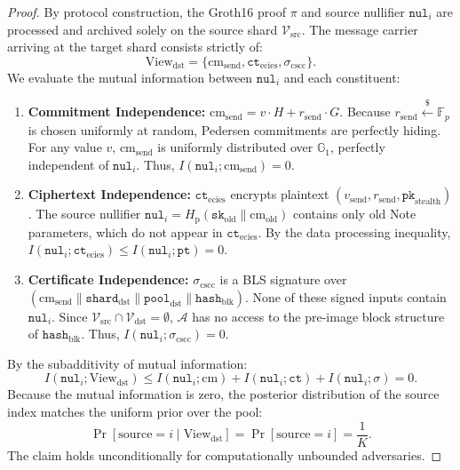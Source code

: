 \documentclass[journal,10pt,twocolumn]{IEEEtran}
\theoremstyle{definition}
\theoremstyle{remark}
\begin{document}
\begin{proof}
By protocol construction, the Groth16 proof $\pi$ and source nullifier $\mathtt{nul}_i$ are processed and archived solely on the source shard $\mathcal{V}_{\text{src}}$. The message carrier arriving at the target shard consists strictly of:
\begin{equation}
\text{View}_{\text{dst}} = \{ \text{cm}_{\text{send}}, \mathtt{ct}_{\text{ecies}}, \sigma_{\text{cscc}} \}.
\end{equation}
We evaluate the mutual information between $\mathtt{nul}_i$ and each constituent:
\begin{enumerate}
    \item \textbf{Commitment Independence:} $\text{cm}_{\text{send}} = v \cdot H + r_{\text{send}} \cdot G$. Because $r_{\text{send}} \xleftarrow{\$} \mathbb{F}_p$ is chosen uniformly at random, Pedersen commitments are perfectly hiding. For any value $v$, $\text{cm}_{\text{send}}$ is uniformly distributed over $\mathbb{G}_1$, perfectly independent of $\mathtt{nul}_i$. Thus, $I(\mathtt{nul}_i; \text{cm}_{\text{send}}) = 0$.
    \item \textbf{Ciphertext Independence:} $\mathtt{ct}_{\text{ecies}}$ encrypts plaintext $(v_{\text{send}}, r_{\text{send}}, \mathtt{pk}_{\text{stealth}})$. The source nullifier $\mathtt{nul}_i = H_{\text{p}}(\mathtt{sk}_{\text{old}} \parallel \text{cm}_{\text{old}})$ contains only old Note parameters, which do not appear in $\mathtt{ct}_{\text{ecies}}$. By the data processing inequality, $I(\mathtt{nul}_i; \mathtt{ct}_{\text{ecies}}) \le I(\mathtt{nul}_i; \mathtt{pt}) = 0$.
    \item \textbf{Certificate Independence:} $\sigma_{\text{cscc}}$ is a BLS signature over $(\text{cm}_{\text{send}} \parallel \mathtt{shard}_{\text{dst}} \parallel \mathtt{pool}_{\text{dst}} \parallel \mathtt{hash}_{\text{blk}})$. None of these signed inputs contain $\mathtt{nul}_i$. Since $\mathcal{V}_{\text{src}} \cap \mathcal{V}_{\text{dst}} = \emptyset$, $\mathcal{A}$ has no access to the pre-image block structure of $\mathtt{hash}_{\text{blk}}$. Thus, $I(\mathtt{nul}_i; \sigma_{\text{cscc}}) = 0$.
\end{enumerate}
By the subadditivity of mutual information:
\begin{equation}
I(\mathtt{nul}_i; \text{View}_{\text{dst}}) \le I(\mathtt{nul}_i; \text{cm}) + I(\mathtt{nul}_i; \mathtt{ct}) + I(\mathtt{nul}_i; \sigma) = 0.
\end{equation}
Because the mutual information is zero, the posterior distribution of the source index matches the uniform prior over the pool:
\begin{equation}
\Pr[\text{source} = i \mid \text{View}_{\text{dst}}] = \Pr[\text{source} = i] = \frac{1}{K}.
\end{equation}
The claim holds unconditionally for computationally unbounded adversaries.
\end{proof}
\end{document}
